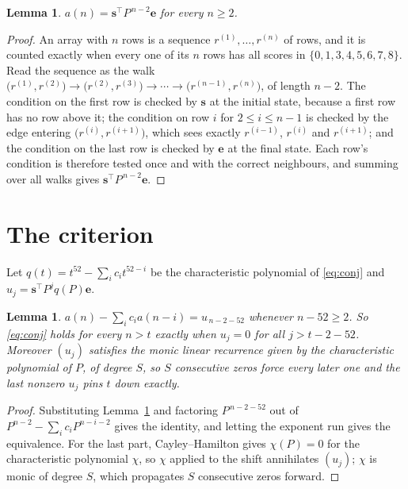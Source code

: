 \documentclass[11pt,a4paper]{article}
\theoremstyle{plain}
\newtheorem{lemma}[theorem]{Lemma}
\theoremstyle{definition}
\begin{document}
\begin{lemma}\label{lem:walk}
$a(n)=\mathbf{s}^{\!\top}P^{\,n-2}\mathbf{e}$ for every $n\ge2$.
\end{lemma}

\begin{proof}
An array with $n$ rows is a sequence $r^{(1)},\dots,r^{(n)}$ of rows, and it is counted
exactly when every one of its $n$ rows has all scores in $\{0,1,3,4,5,6,7,8\}$. Read the sequence as the
walk $\bigl(r^{(1)},r^{(2)}\bigr)\to\bigl(r^{(2)},r^{(3)}\bigr)\to\cdots\to
\bigl(r^{(n-1)},r^{(n)}\bigr)$, of length $n-2$. The condition on the first row is
checked by $\mathbf{s}$ at the initial state, because a first row has no row above it; the
condition on row $i$ for $2\le i\le n-1$ is checked by the edge entering
$\bigl(r^{(i)},r^{(i+1)}\bigr)$, which sees exactly $r^{(i-1)}$, $r^{(i)}$ and
$r^{(i+1)}$; and the condition on the last row is checked by $\mathbf{e}$ at the final
state. Each row's condition is therefore tested once and with the correct neighbours, and
summing over all walks gives $\mathbf{s}^{\!\top}P^{\,n-2}\mathbf{e}$.
\end{proof}

\section{The criterion}

Let $q(t)=t^{52}-\sum_i c_i t^{52-i}$ be the characteristic polynomial of
\eqref{eq:conj} and $u_j=\mathbf{s}^{\!\top}P^{j}q(P)\mathbf{e}$.

\begin{lemma}\label{lem:crit}
$a(n)-\sum_i c_i a(n-i)=u_{\,n-2-52}$ whenever $n-52\ge2$. So \eqref{eq:conj}
holds for every $n>t$ exactly when $u_j=0$ for all $j>t-2-52$. Moreover $(u_j)$
satisfies the monic linear recurrence given by the characteristic polynomial of $P$, of
degree $S$, so $S$ consecutive zeros force every later one and the last nonzero $u_j$ pins
$t$ down exactly.
\end{lemma}

\begin{proof}
Substituting Lemma~\ref{lem:walk} and factoring $P^{\,n-2-52}$ out of
$P^{n-2}-\sum_i c_i P^{n-i-2}$ gives the identity, and letting the exponent run gives the
equivalence. For the last part, Cayley--Hamilton gives $\chi(P)=0$ for the characteristic
polynomial $\chi$, so $\chi$ applied to the shift annihilates $(u_j)$; $\chi$ is monic of
degree $S$, which propagates $S$ consecutive zeros forward.
\end{proof}
\end{document}
